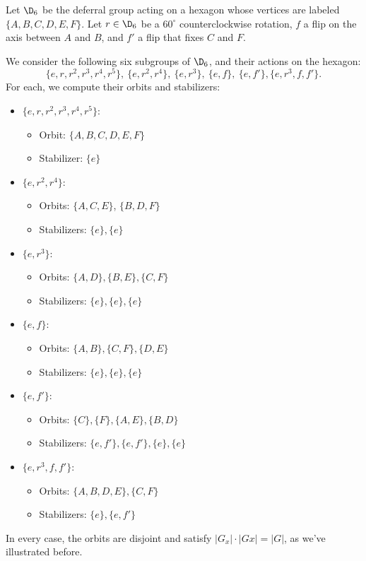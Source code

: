 \documentclass[math1530-lecture-notes]{subfiles}
\begin{document}
\begin{example}
  Let $\D_6$ be the deferral group acting on a hexagon whose vertices are labeled $\{ A,B,C,D,E,F
  \}$. Let $r\in \D_6$ be a $60^{\circ}$ counterclockwise rotation, $f$ a flip on the axis between
  $A$ and $B$, and $f'$ a flip that fixes $C$ and $F$. 

  We consider the following six subgroups of $\D_6$, and their actions on the hexagon: \[
    \{ e,r,r^2,r^3,r^4,r^5 \},\ \{ e,r^2,r^4 \},\ \{ e,r^3 \},\ \{ e,f \},\ \{ e,f' \}, \{
    e,r^3,f,f' \}
  .\] For each, we compute their orbits and stabilizers:
  \begin{itemize}
    \item $\{ e,r,r^2,r^3,r^4,r^5 \}$:
      \begin{itemize}
        \item Orbit: $\{ A,B,C,D,E,F \}$
        \item Stabilizer: $\{ e \}$
      \end{itemize}
    \item $\{ e,r^2,r^4 \}$:
      \begin{itemize}
        \item Orbits: $\{ A,C,E \}$, $\{ B,D,F \}$
        \item Stabilizers: $\{ e \}, \{ e \}$
      \end{itemize}
    \item $\{ e,r^3 \}$:
      \begin{itemize}
        \item Orbits: $\{ A,D \},\{ B,E \},\{ C,F \}$
        \item Stabilizers: $\{ e \},\{ e \},\{ e \}$
      \end{itemize}
    \item $\{ e,f \}$:
      \begin{itemize}
        \item Orbits: $\{ A,B \},\{ C,F \},\{ D,E \}$
        \item Stabilizers: $\{ e \},\{ e \},\{ e \}$
      \end{itemize}
    \item $\{ e,f' \}$:
      \begin{itemize}
        \item Orbits: $\{ C\},\{F \},\{ A,E \},\{ B,D \}$
        \item Stabilizers: $\{ e,f' \},\{ e,f' \},\{ e \},\{ e \}$
      \end{itemize}
    \item $\{ e,r^3,f,f' \}$:
      \begin{itemize}
        \item Orbits: $\{ A,B,D,E \},\{ C,F \}$
        \item Stabilizers: $\{ e \},\{ e,f' \}$
      \end{itemize}
  \end{itemize}
  In every case, the orbits are disjoint and satisfy $\left| G_x \right| \cdot \left| Gx \right|
  =\left| G \right| $, as we've illustrated before.


\end{example}
\end{document}

